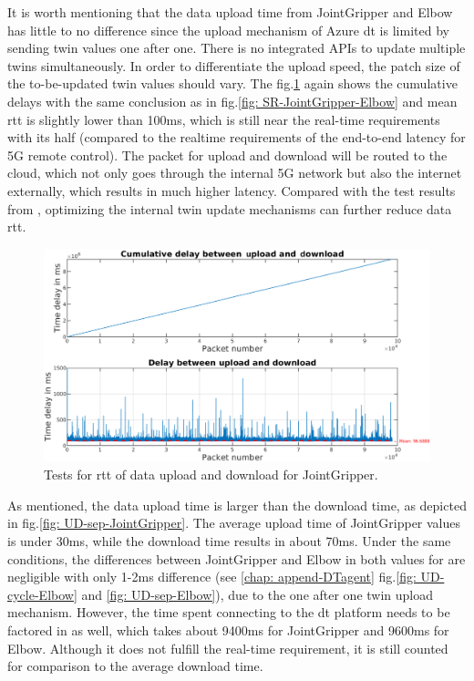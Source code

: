 It is worth mentioning that the data upload time from JointGripper and Elbow has little to 
no difference since the upload mechanism of Azure \gls{dt} is limited by sending twin 
values one after one. There is no integrated APIs to update multiple twins simultaneously. 
In order to differentiate the upload speed, the patch size of the to-be-updated twin values 
should vary. The fig.\ref{fig: UD-cycle-JointGripper} again shows the cumulative delays 
with the same conclusion as in fig.\ref{fig: SR-JointGripper-Elbow} and mean \gls{rtt} is 
slightly lower than 100ms, which is still near the real-time requirements with its half 
(compared to the realtime requirements of the end-to-end latency for 5G remote control\cite{li_5g_2018}). 
The packet for 
upload and download will be routed to the cloud, which not only goes through the internal 
5G network but also the internet externally, which results in much higher latency. Compared 
with the test results from \cite{cainelli_performance_2023}, optimizing the internal twin 
update mechanisms can further reduce data \gls{rtt}. 


\begin{figure}[htb]
    \centering
    \includegraphics[width=\textwidth]{figures/tests/DT/Delay_UploadDownloadCycleTime_JointGripper.pdf}
    \caption{Tests for \gls{rtt} of data upload and download for JointGripper. \label{fig: UD-cycle-JointGripper}}
\end{figure}

As mentioned, the data upload time is larger than the download time, as depicted in 
fig.\ref{fig: UD-sep-JointGripper}. The average upload time of JointGripper values is under 30ms, 
while the download time results in about 70ms. Under the same conditions, the differences 
between JointGripper and Elbow in both values for are negligible with only 1-2ms difference (see \ref{chap: append-DTagent} fig.\ref{fig: UD-cycle-Elbow} 
and \ref{fig: UD-sep-Elbow}), due to the one after one twin upload mechanism. However, 
the time spent connecting to the \gls{dt} platform needs to be factored in 
as well, which takes about 9400ms for JointGripper and 9600ms for Elbow. Although it 
does not fulfill the real-time requirement, it is still counted for comparison 
to the average download time.




